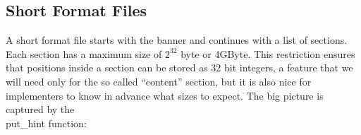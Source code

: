 

\subsection{Short Format Files}\gdef\subcodetitle{Primitives}%
A short format file starts with the banner and continues
with a list of sections. Each section has a maximum size
of $2^{32}$ byte or 4GByte. This restriction ensures that positions
inside a section can be stored as 32 bit integers, a feature that
we will need only for the so called ``content'' section, but it
is also nice for implementers to know in advance what sizes to expect.
The big picture is captured by the \\{put\_hint} function:

